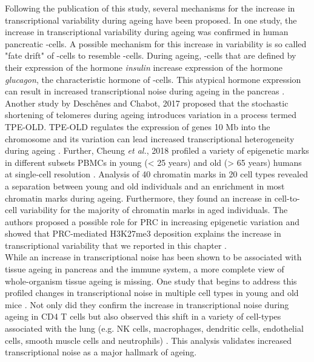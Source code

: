 Following the publication of this study, several mechanisms for the increase in transcriptional variability during ageing have been proposed. In one study, the increase in transcriptional variability during ageing was confirmed in human pancreatic \textbeta{}-cells. A possible mechanism for this increase in variability is so called "fate drift" of \textbeta{}-cells to resemble \textalpha{}-cells. During ageing, \textbeta{}-cells that are defined by their expression of the hormone \emph{insulin} increase expression of the hormone \emph{glucagon}, the characteristic hormone of \textalpha{}-cells. This atypical hormone expression can result in increased transcriptional noise during ageing in the pancreas \citep{Enge2017}. Another study by Desch\^{e}nes and Chabot, 2017 proposed that the stochastic shortening of telomeres during ageing introduces variation in a process termed \gls{TPE-OLD}. TPE-OLD regulates the expression of genes 10 Mb into the chromosome and its variation can lead increased transcriptional heterogeneity during ageing \cite{Deschenes2017}. Further, Cheung \emph{et al.}, 2018 profiled a variety of epigenetic marks in different subsets \glspl{PBMC} in young (< 25 years) and old (> 65 years) humans at single-cell resolution \citep{Cheung2018}. Analysis of 40 chromatin marks in 20 cell types revealed a separation between young and old individuals and an enrichment in most chromatin marks during ageing. Furthermore, they found an increase in cell-to-cell variability for the majority of chromatin marks in aged individuals. The authors proposed a possible role for \gls{PRC} in increasing epigenetic variation and showed that PRC-mediated H3K27me3 deposition explains the increase in transcriptional variability that we reported in this chapter \citep{Cheung2018}.\\

While an increase in transcriptional noise has been shown to be associated with tissue ageing in pancreas and the immune system, a more complete view of whole-organism tissue ageing is missing. One study that begins to address this profiled changes in transcriptional noise in multiple cell types in young and old mice \citep{Angelidis2018}. Not only did they confirm the increase in transcriptional noise during ageing in CD4\plus{} T cells but also observed this shift in a variety of cell-types associated with the lung (e.g. NK cells, macrophages, dendritic cells, endothelial cells, smooth muscle cells and neutrophils) \citep{Angelidis2018}. This analysis validates increased transcriptional noise as a major hallmark of ageing. \\

